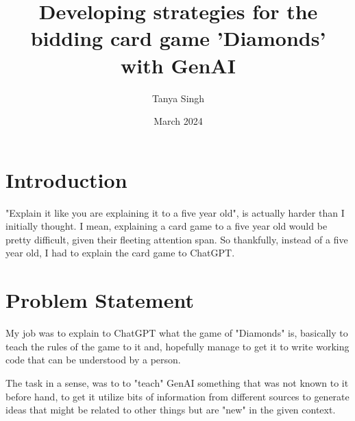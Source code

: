 \documentclass{article}
\title{Developing strategies for the bidding card game 'Diamonds' with GenAI}
\author{Tanya Singh}
\date{March 2024}
\begin{document}
\maketitle

\section{Introduction}
"Explain it like you are explaining it to a five year old", is actually harder than I initially thought. I mean, explaining a card game to a five year old would be pretty difficult, given their fleeting attention span. So thankfully, instead of a five year old, I had to explain the card game to ChatGPT.

\section{Problem Statement}
My job was to explain to ChatGPT what the game of "Diamonds" is, basically to teach the rules of the game to it and, hopefully manage to get it to write working code that can be understood by a person.

The task in a sense, was to to "teach" GenAI something that was not known to it before hand, to get it utilize bits of information from different sources to generate ideas that might be related to other things but are "new" in the given context. 
\end{document}
